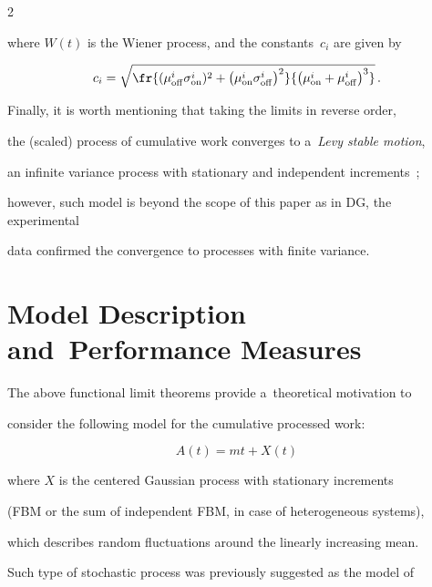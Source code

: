 \begin{multicols}{2}
\begin{equation*}

\end{equation*}

where $W(t)$ is the Wiener process, and the constants~$c_i$ are given by

$$

c_i = \sqrt{ \fr{ (\mu_{\mathrm{off}}^i\sigma_{\mathrm{on}}^i)^2 + 

\left(\mu_{\mathrm{on}}^i\sigma_{\mathrm{off}}^i\right)^2 }{\left(\mu_{\mathrm{on}}^i+\mu_{\mathrm{off}}^i\right)^3}}\,.

$$

Finally, it is worth mentioning that taking the limits in reverse order, 

the (scaled) process of cumulative work converges to a~\textit{Levy stable motion}, 

an infinite variance process with stationary and independent increments~\cite{14-luk-1}; 

however, such  model is beyond the scope of this paper as in DG, the experimental 

data confirmed the convergence to processes with finite variance.





\section{Model Description and~Performance Measures}





\noindent

The above functional limit theorems provide a~theoretical motivation to 

consider the following model for the cumulative processed work: 

\begin{equation}

    A(t) = m t + X(t)

    \label{6}

\end{equation}

where $X$ is the centered Gaussian process with stationary increments 

(FBM or the sum of independent FBM, in case of heterogeneous systems),

 which describes random fluctuations around the linearly  increasing mean. 

 Such type of stochastic process was previously suggested as the model of 


\end{multicols}
